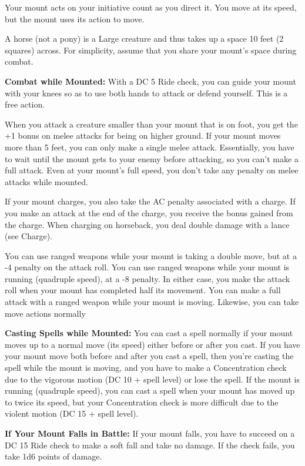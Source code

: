 \documentclass{article}
\begin{document}
Your mount acts on your initiative count as you direct it. You move at its speed, 
but the mount uses its action to move.

A horse (not a pony) is a Large creature and thus takes up a space 10 feet (2 squares) 
across. For simplicity, assume that you share your mount's space during combat.

\textbf{Combat while Mounted:} With a DC 5 Ride check, you can guide your mount 
with your knees so as to use both hands to attack or defend yourself. This is a 
free action.

When you attack a creature smaller than your mount that is on foot, you get the 
+1 bonus on melee attacks for being on higher ground. If your mount moves more 
than 5 feet, you can only make a single melee attack. Essentially, you have to 
wait until the mount gets to your enemy before attacking, so you can't make a full 
attack. Even at your mount's full speed, you don't take any penalty on melee attacks 
while mounted.

If your mount charges, you also take the AC penalty associated with a charge. If 
you make an attack at the end of the charge, you receive the bonus gained from 
the charge. When charging on horseback, you deal double damage with a lance (see 
Charge).

You can use ranged weapons while your mount is taking a double move, but at a -4 
penalty on the attack roll. You can use ranged weapons while your mount is running 
(quadruple speed), at a -8 penalty. In either case, you make the attack roll when 
your mount has completed half its movement. You can make a full attack with a ranged 
weapon while your mount is moving. Likewise, you can take move actions normally

\textbf{Casting Spells while Mounted:} You can cast a spell normally if your mount 
moves up to a normal move (its speed) either before or after you cast. If you have 
your mount move both before and after you cast a spell, then you're casting the 
spell while the mount is moving, and you have to make a Concentration check due 
to the vigorous motion (DC 10 + spell level) or lose the spell. If the mount is 
running (quadruple speed), you can cast a spell when your mount has moved up to 
twice its speed, but your Concentration check is more difficult due to the violent 
motion (DC 15 + spell level).

\textbf{If Your Mount Falls in Battle:} If your mount falls, you have to succeed 
on a DC 15 Ride check to make a soft fall and take no damage. If the check fails, 
you take 1d6 points of damage.
\end{document}
